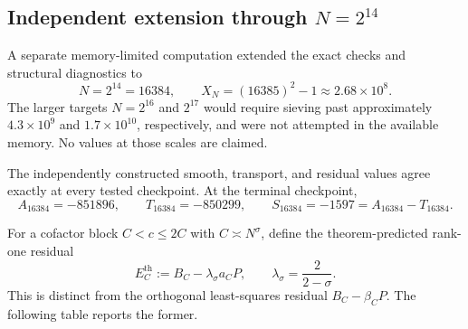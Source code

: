 \subsection{Independent extension through $N=2^{14}$}
\label{subsec:numerics-16384}

A separate memory-limited computation extended the exact checks and structural diagnostics to
\begin{equation}
 N=2^{14}=16384,
 \qquad
 X_N=(16385)^2-1\approx2.68\times10^8.
 \label{eq:extended-range-16384}
\end{equation}
The larger targets $N=2^{16}$ and $2^{17}$ would require sieving past approximately $4.3\times10^9$ and $1.7\times10^{10}$, respectively, and were not attempted in the available memory.  No values at those scales are claimed.

The independently constructed smooth, transport, and residual values agree exactly at every tested checkpoint.  At the terminal checkpoint,
\begin{equation}
 \boxed{
 A_{16384}=-851896,
 \qquad
 T_{16384}=-850299,
 \qquad
 S_{16384}=-1597=A_{16384}-T_{16384}.
 }
 \label{eq:extended-terminal-identity}
\end{equation}

For a cofactor block $C<c\le2C$ with $C\asymp N^\sigma$, define the theorem-predicted rank-one residual
\begin{equation}
 E_C^{\mathrm{th}}
 :=B_C-\lambda_\sigma a_C P,
 \qquad
 \lambda_\sigma=\frac{2}{2-\sigma}.
 \label{eq:theorem-predicted-residual}
\end{equation}
This is distinct from the orthogonal least-squares residual $B_C-\widehat\beta_CP$.  The following table reports the former.

